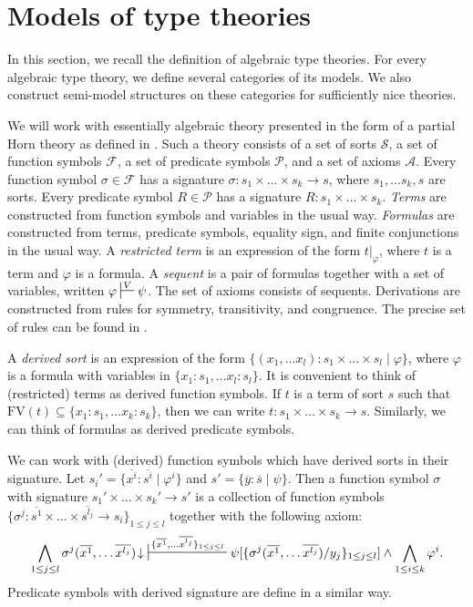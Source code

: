 \documentclass[reqno]{amsart}
\theoremstyle{definition}
\theoremstyle{remark}
\newcommand{\fs}[1]{\mathrm{#1}}
\numberwithin{figure}{section}
\begin{document}
\section{Models of type theories}

In this section, we recall the definition of algebraic type theories.
For every algebraic type theory, we define several categories of its models.
We also construct semi-model structures on these categories for sufficiently nice theories.

We will work with essentially algebraic theory presented in the form of a partial Horn theory as defined in \cite{PHL}.
Such a theory consists of a set of sorts $\mathcal{S}$, a set of function symbols $\mathcal{F}$, a set of predicate symbols $\mathcal{P}$, and a set of axioms $\mathcal{A}$.
Every function symbol $\sigma \in \mathcal{F}$ has a signature $\sigma : s_1 \times \ldots \times s_k \to s$, where $s_1, \ldots s_k, s$ are sorts.
Every predicate symbol $R \in \mathcal{P}$ has a signature $R : s_1 \times \ldots \times s_k$.
\emph{Terms} are constructed from function symbols and variables in the usual way.
\emph{Formulas} are constructed from terms, predicate symbols, equality sign, and finite conjunctions in the usual way.
A \emph{restricted term} is an expression of the form $t|_\varphi$, where $t$ is a term and $\varphi$ is a formula.
A \emph{sequent} is a pair of formulas together with a set of variables, written $\varphi \sststile{}{V} \psi$.
The set of axioms consists of sequents.
Derivations are constructed from rules for symmetry, transitivity, and congruence.
The precise set of rules can be found in \cite{PHL,alg-tt,morita-equiv}.

A \emph{derived sort} is an expression of the form $\{ (x_1, \ldots x_l) : s_1 \times \ldots \times s_l \mid \varphi \}$,
where $\varphi$ is a formula with variables in $\{ x_1 : s_1, \ldots x_l : s_l \}$.
It is convenient to think of (restricted) terms as derived function symbols.
If $t$ is a term of sort $s$ such that $\fs{FV}(t) \subseteq \{ x_1 : s_1, \ldots x_k : s_k \}$, then we can write $t : s_1 \times \ldots \times s_k \to s$.
Similarly, we can think of formulas as derived predicate symbols.

We can work with (derived) function symbols which have derived sorts in their signature.
Let $s_i' = \{ \overline{x^i} : \overline{s^i} \mid \varphi^i \}$ and $s' = \{ \overline{y} : \overline{s} \mid \psi \}$.
Then a function symbol $\sigma$ with signature $s_1' \times \ldots \times s_k' \to s'$ is a collection of function symbols
$\{ \sigma^j : \overline{s^1} \times \ldots \times \overline{s^{l_j}} \to s_i \}_{1 \leq j \leq l}$ together with the following axiom:
\[ \bigwedge_{1 \leq j \leq l} \sigma^j(\overline{x^1}, \ldots \overline{x^{l_j}})\!\downarrow\ \sststile{}{\{ \overline{x^1}, \ldots \overline{x^{l_j}} \}_{1 \leq j \leq l}} \psi[\{ \sigma^j(\overline{x^1}, \ldots \overline{x^{l_j}})/y_j \}_{1 \leq j \leq l}] \land \bigwedge_{1 \leq i \leq k} \varphi^i. \]
Predicate symbols with derived signature are define in a similar way.
\end{document}
